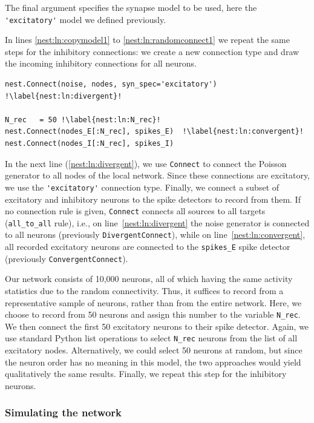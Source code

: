 \documentclass{article}
\begin{document}
The final argument specifies the synapse model to be used, here the
\lstinline!'excitatory'! model we defined previously.


In lines \ref{nest:ln:copymodel1} to \ref{nest:ln:randomconnect1} we
repeat the same steps for the inhibitory connections: we create a new
connection type and draw the incoming inhibitory connections for all neurons.

\begin{lstlisting}[name=Brunel_interactive]
nest.Connect(noise, nodes, syn_spec='excitatory') !\label{nest:ln:divergent}!

N_rec   = 50 !\label{nest:ln:N_rec}!
nest.Connect(nodes_E[:N_rec], spikes_E)  !\label{nest:ln:convergent}!
nest.Connect(nodes_I[:N_rec], spikes_I)
\end{lstlisting}

In the next line (\ref{nest:ln:divergent}), we use
\lstinline!Connect! to
connect the Poisson generator to all nodes of the local network. Since
these connections are excitatory, we use the \lstinline!'excitatory'!
connection type. Finally, we connect a subset of excitatory and
inhibitory neurons to the spike detectors to record from them. If no connection rule
is given, \lstinline!Connect! connects all sources to all targets (\lstinline!all_to_all! rule), 
i.e., on line~\ref{nest:ln:divergent} the noise generator is connected to all neurons 
(previously \lstinline!DivergentConnect!), while on line~\ref{nest:ln:convergent}, all recorded 
excitatory neurons are connected to the \lstinline!spikes_E! spike detector 
(previously \lstinline!ConvergentConnect!).

Our network consists of 10,000 neurons, all of which having the same
activity statistics due to the random connectivity. Thus, it suffices
to record from a representative sample of neurons, rather than from
the entire network. Here, we choose to record from 50 neurons and
assign this number to the variable \lstinline!N_rec!. We then connect
the first 50 excitatory neurons to their spike detector. Again, we use
standard Python list operations to select \lstinline!N_rec! neurons
from the list of all excitatory nodes. Alternatively, we could select
50 neurons at random, but since the neuron order has no meaning in
this model, the two approaches would yield qualitatively the same
results. Finally, we repeat this step for the inhibitory neurons.

\subsubsection{Simulating the network}
\end{document}
